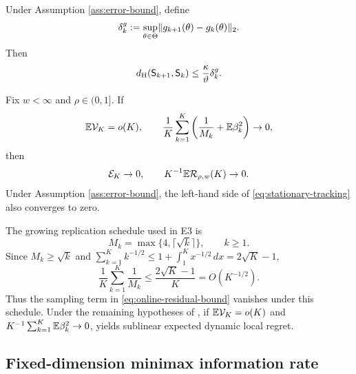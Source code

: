 \begin{lemma}\label{lem:stationary-set-drift}
Under Assumption \ref{ass:error-bound}, define
\begin{equation}\label{eq:gradient-drift}
 \delta_k^g:=\sup_{\theta\in\Theta}
 \lVert g_{k+1}(\theta)-g_k(\theta)\rVert_2.
\end{equation}
Then
\begin{equation}\label{eq:stationary-set-drift}
 d_{\mathrm H}(\mathsf S_{k+1},\mathsf S_k)
 \le\frac{\kappa}{\vartheta}\delta_k^g.
\end{equation}
\end{lemma}

\begin{corollary}\label{cor:vanishing-tracking}
Fix $w<\infty$ and $\rho\in(0,1]$.  If
\begin{equation}\label{eq:vanishing-conditions}
 \mathbb E\mathcal V_K=o(K),
 \qquad
 \frac1K\sum_{k=1}^{K}
 \left(\frac1{M_k}+\mathbb E\beta_k^2\right)\to0,
\end{equation}
then
\begin{equation}\label{eq:vanishing-conclusion}
 \mathcal E_K\to0,
 \qquad
 K^{-1}\mathbb E\mathcal R_{\rho,w}(K)\to0.
\end{equation}
Under Assumption \ref{ass:error-bound}, the left-hand side of \eqref{eq:stationary-tracking} also converges to zero.
\end{corollary}

The growing replication schedule used in E3 is
\begin{equation}\label{eq:growing-replication}
 M_k=\max\{4,\lceil\sqrt{k}\rceil\},\qquad k\ge1.
\end{equation}
Since $M_k\ge\sqrt{k}$ and
$\sum_{k=1}^{K}k^{-1/2}\le1+\int_1^K x^{-1/2}\,dx=2\sqrt K-1$,
\begin{equation}\label{eq:growing-replication-bound}
 \frac1K\sum_{k=1}^{K}\frac1{M_k}
 \le\frac{2\sqrt K-1}{K}=O(K^{-1/2}).
\end{equation}
Thus the sampling term in \eqref{eq:online-residual-bound} vanishes under this schedule.  Under the remaining hypotheses of , if $\mathbb E\mathcal V_K=o(K)$ and $K^{-1}\sum_{k=1}^{K}\mathbb E\beta_k^2\to0$,  yields sublinear expected dynamic local regret.

\subsection{Fixed-dimension minimax information rate}

